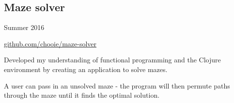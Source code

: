 \noindent\begin{minipage}[b]{0.8\textwidth}
  \subsection*{Maze solver}
\end{minipage}
\noindent\begin{minipage}[b]{0.2\textwidth}
  \flushright
  Summer 2016
\end{minipage}

\href{https://github.com/chooie/maze-solver} {github.com/chooie/maze-solver}

\begin{itemize}
  {\small
  \item Developed my understanding of functional programming and the Clojure
    environment by creating an application to solve mazes.
  \item A user can pass in an unsolved maze - the program will then permute
    paths through the maze until it finds the optimal solution.
  }
\end{itemize}

